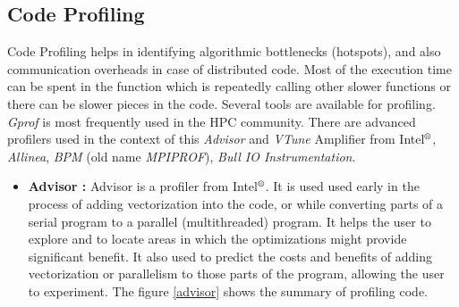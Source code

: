 \subsection{Code Profiling} \label{profiling}
Code Profiling helps in identifying algorithmic bottlenecks (hotspots), and also communication overheads in case of distributed code. Most of the execution time can be spent in the function which is repeatedly calling other slower functions or there can be slower pieces in the code. Several tools are available for profiling. \textit{Gprof} is most frequently used in the HPC community. There are advanced profilers used in the context of this \textit{Advisor} and \textit{VTune} Amplifier from Intel$^{\mbox{\scriptsize{\textregistered}}}$, \textit{Allinea}, \textit{BPM} (old name \textit{MPIPROF}), \textit{Bull IO Instrumentation}. 
\begin{itemize}
\item \textbf{Advisor :}
Advisor is a profiler from Intel$^{\mbox{\scriptsize{\textregistered}}}$. It is used used early in the process of adding vectorization into the code, or while converting parts of a serial program to a parallel (multithreaded) program. It helps the user to explore and to locate areas in which the optimizations might provide significant benefit. It also used to predict the costs and benefits of adding vectorization or parallelism to those parts of the program, allowing the user to experiment. The figure \ref{advisor} shows the summary of profiling code. 


\end{itemize}
